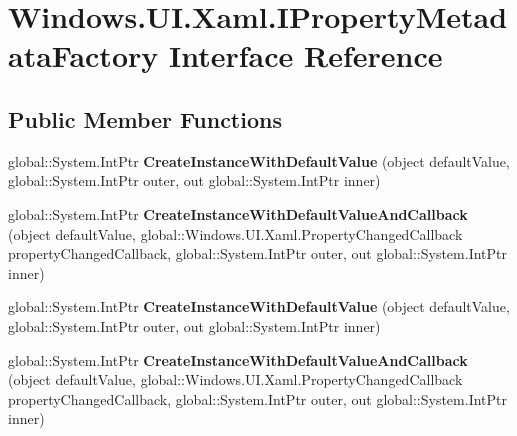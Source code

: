 \hypertarget{interface_windows_1_1_u_i_1_1_xaml_1_1_i_property_metadata_factory}{}\section{Windows.\+U\+I.\+Xaml.\+I\+Property\+Metadata\+Factory Interface Reference}
\label{interface_windows_1_1_u_i_1_1_xaml_1_1_i_property_metadata_factory}
\subsection*{Public Member Functions}
\begin{DoxyCompactItemize}
\item 
\mbox{\label{interface_windows_1_1_u_i_1_1_xaml_1_1_i_property_metadata_factory_a926290cdd228b3558307d0600c236f50}} 
global\+::\+System.\+Int\+Ptr {\bfseries Create\+Instance\+With\+Default\+Value} (object default\+Value, global\+::\+System.\+Int\+Ptr outer, out global\+::\+System.\+Int\+Ptr inner)
\item 
\mbox{\label{interface_windows_1_1_u_i_1_1_xaml_1_1_i_property_metadata_factory_a42ba155ca7cc180032675c2cd37593e2}} 
global\+::\+System.\+Int\+Ptr {\bfseries Create\+Instance\+With\+Default\+Value\+And\+Callback} (object default\+Value, global\+::\+Windows.\+U\+I.\+Xaml.\+Property\+Changed\+Callback property\+Changed\+Callback, global\+::\+System.\+Int\+Ptr outer, out global\+::\+System.\+Int\+Ptr inner)
\item 
\mbox{\label{interface_windows_1_1_u_i_1_1_xaml_1_1_i_property_metadata_factory_a926290cdd228b3558307d0600c236f50}} 
global\+::\+System.\+Int\+Ptr {\bfseries Create\+Instance\+With\+Default\+Value} (object default\+Value, global\+::\+System.\+Int\+Ptr outer, out global\+::\+System.\+Int\+Ptr inner)
\item 
\mbox{\label{interface_windows_1_1_u_i_1_1_xaml_1_1_i_property_metadata_factory_a42ba155ca7cc180032675c2cd37593e2}} 
global\+::\+System.\+Int\+Ptr {\bfseries Create\+Instance\+With\+Default\+Value\+And\+Callback} (object default\+Value, global\+::\+Windows.\+U\+I.\+Xaml.\+Property\+Changed\+Callback property\+Changed\+Callback, global\+::\+System.\+Int\+Ptr outer, out global\+::\+System.\+Int\+Ptr inner)

\end{DoxyCompactItemize}
